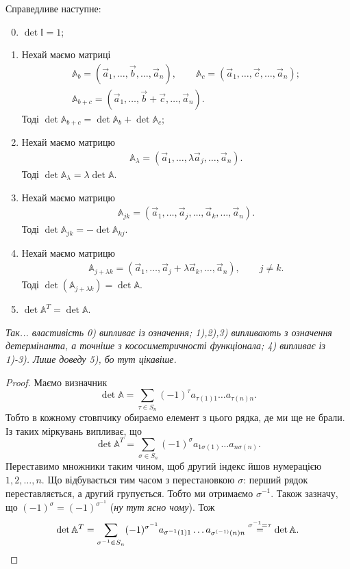 \documentclass{math_library}
\begin{document}
\begin{proposition}
Справедливе наступне:
\begin{enumerate}[nosep,wide=0pt,label={\arabic*)}]
\setcounter{enumi}{-1}
\item $\det \mathbb{I} = 1$;
\item Нехай маємо матриці
\begin{align*}
\mathbb{A}_b = (\vec{a}_1, \dots, \vec{b}, \dots, \vec{a}_n), \qquad \mathbb{A}_c = (\vec{a}_1, \dots, \vec{c}, \dots, \vec{a}_n); \\
\mathbb{A}_{b+c} = (\vec{a}_1, \dots, \vec{b}+\vec{c}, \dots, \vec{a}_n).
\end{align*}
Тоді $\det \mathbb{A}_{b+c} = \det \mathbb{A}_b + \det \mathbb{A}_{c}$;
\item Нехай маємо матрицю
\begin{align*}
\mathbb{A}_{\lambda} = (\vec{a}_1, \dots, \lambda \vec{a}_j, \dots, \vec{a}_n).
\end{align*}
Тоді $\det \mathbb{A}_{\lambda} = \lambda \det \mathbb{A}$.
\item Нехай маємо матрицю
\begin{align*}
 \mathbb{A}_{jk} = (\vec{a}_1, \dots, \vec{a}_j, \dots, \vec{a}_k, \dots, \vec{a}_n).
 \end{align*}
 Тоді $\det \mathbb{A}_{jk} = - \det \mathbb{A}_{kj}$.
\item Нехай маємо матрицю
\begin{align*}
\mathbb{A}_{j + \lambda k} = (\vec{a}_1,\dots, \vec{a}_j + \lambda \vec{a}_k, \dots, \vec{a}_n), \qquad j \neq k.
\end{align*}
Тоді $\det (\mathbb{A}_{j + \lambda k}) = \det \mathbb{A}$.
\item $\det \mathbb{A}^T = \det \mathbb{A}$.
\end{enumerate}
\end{proposition}

\textit{Так... властивість 0) випливає із означення; 1),2),3) випливають з означення детермінанта, а точніше з кососиметричності функціонала; 4) випливає із 1)-3). Лише доведу 5), бо тут цікавіше.}

\begin{proof}
Маємо визначник 
\[
\det \mathbb{A} = \displaystyle\sum_{\tau \in S_n} (-1)^{\tau}a_{\tau(1)1}\dots a_{\tau(n)n}.
\]
Тобто в кожному стовпчику обираємо елемент з цього рядка, де ми ще не брали. Із таких міркувань випливає, що 
\[
\det \mathbb{A}^T = \displaystyle\sum_{\sigma \in S_n} (-1)^{\sigma}a_{1 \sigma(1)}\dots a_{n \sigma(n)}.
\]
Переставимо множники таким чином, щоб другий індекс йшов нумерацією $1,2,\dots,n$. Що відбувається тим часом з перестановкою $\sigma$: перший рядок переставляється, а другий групується. Тобто ми отримаємо $\sigma^{-1}$. Також зазначу, що $(-1)^\sigma = (-1)^{\sigma^{-1}}$ (\textit{ну тут ясно чому}). Тож 
\[
\det \mathbb{A}^T = \displaystyle\sum_{\sigma^{-1} \in S_n} (-1)^{\sigma^{-1}} a_{\sigma^{-1}(1)1}\dots a_{\sigma^{(-1)}(n)n} \overset{\sigma^{-1} = \tau}{=} \det \mathbb{A}. \qedhere
\]
\end{proof}
\end{document}
